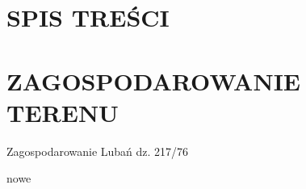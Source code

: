 \documentclass{article}
\def \adresDzialki {Lubań dz. 217/76}
\begin{document}
\section{SPIS TREŚCI}
\tableofcontents

\newpage

\section{ZAGOSPODAROWANIE TERENU}
Zagospodarowanie
\adresDzialki

nowe
\end{document}
